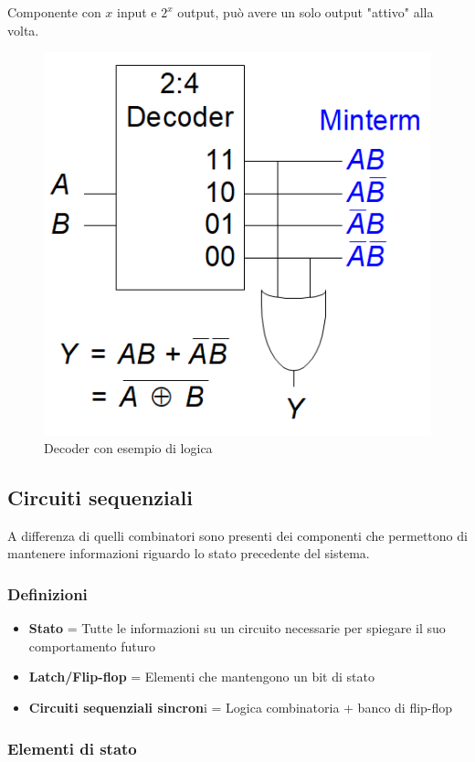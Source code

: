 \documentclass{article}
\begin{document}
\begin{itemize}
Componente con $x$ input e $2^x$ output, può avere un solo output "attivo" alla volta.

\vspace{5pt}

\begin{figure}[ht]
    \centering
    \includegraphics[width=0.55\linewidth]{decoder.png}
    \caption{Decoder con esempio di logica}
    \label{fig:decoder}
\end{figure}
    
\end{itemize}

\subsection{Circuiti sequenziali}

A differenza di quelli combinatori sono presenti dei componenti che permettono di mantenere informazioni riguardo lo stato precedente del sistema.

\subsubsection{Definizioni}

\begin{itemize}
    \item \textbf{Stato} = Tutte le informazioni su un circuito necessarie per spiegare il suo comportamento futuro
    \item \textbf{Latch/Flip-flop} = Elementi che mantengono un bit di stato
    \item \textbf{Circuiti sequenziali sincron}i = Logica combinatoria + banco di flip-flop
\end{itemize}

\newpage

\subsubsection{Elementi di stato}
\end{document}

